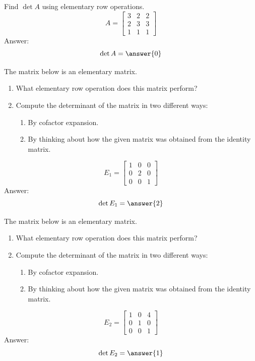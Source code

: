 \documentclass{ximera}
\begin{document}
\begin{problem}\label{prob:elemrowopsdet2}
Find $\det{A}$ using elementary row operations.
$$A=\begin{bmatrix}3&2&2\\2&3&3\\1&1&1\end{bmatrix}$$
Answer:
$$\det{A}=\answer{0}$$
\end{problem}


   
  \begin{problem}\label{prob:elemmatdet1}
  The matrix below is an elementary matrix.
  \begin{enumerate}
  \item What elementary row operation does this matrix perform?
  \item Compute the determinant of the matrix in two different ways:
    \begin{enumerate}
    \item By cofactor expansion.
    \item By thinking about how the given matrix was obtained from the identity matrix.
    \end{enumerate}
  \end{enumerate}
  $$E_1=\begin{bmatrix}1&0&0\\0&2&0\\0&0&1\end{bmatrix}$$
   Answer: $$\det{E_1}=\answer{2}$$
  \end{problem}
  
  \begin{problem}\label{prob:elemmatdet2}
   The matrix below is an elementary matrix.
  \begin{enumerate}
  \item What elementary row operation does this matrix perform?
  \item Compute the determinant of the matrix in two different ways:
    \begin{enumerate}
    \item By cofactor expansion.
    \item By thinking about how the given matrix was obtained from the identity matrix.
    \end{enumerate}
  \end{enumerate}
  $$E_2=\begin{bmatrix}1&0&4\\0&1&0\\0&0&1\end{bmatrix}$$
   Answer: $$\det{E_2}=\answer{1}$$
  \end{problem}
  
\end{document}
